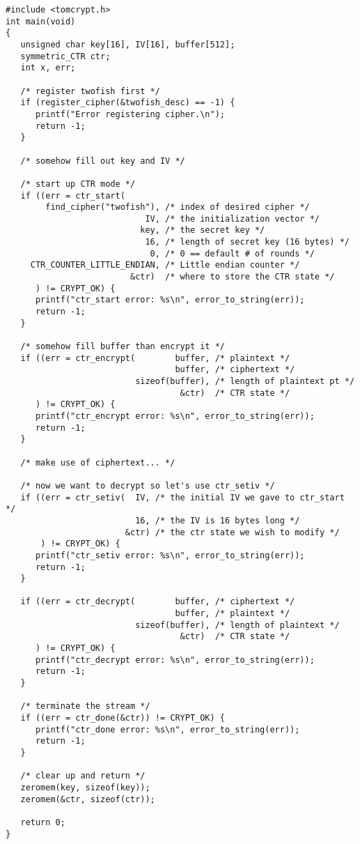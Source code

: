 \documentclass[synpaper]{book}
\begin{document}
\begin{small}
\begin{verbatim}
#include <tomcrypt.h>
int main(void)
{
   unsigned char key[16], IV[16], buffer[512];
   symmetric_CTR ctr;
   int x, err;

   /* register twofish first */
   if (register_cipher(&twofish_desc) == -1) {
      printf("Error registering cipher.\n");
      return -1;
   }

   /* somehow fill out key and IV */

   /* start up CTR mode */
   if ((err = ctr_start(
        find_cipher("twofish"), /* index of desired cipher */
                            IV, /* the initialization vector */
                           key, /* the secret key */
                            16, /* length of secret key (16 bytes) */
                             0, /* 0 == default # of rounds */
     CTR_COUNTER_LITTLE_ENDIAN, /* Little endian counter */
                         &ctr)  /* where to store the CTR state */
      ) != CRYPT_OK) {
      printf("ctr_start error: %s\n", error_to_string(err));
      return -1;
   }

   /* somehow fill buffer than encrypt it */
   if ((err = ctr_encrypt(        buffer, /* plaintext */
                                  buffer, /* ciphertext */
                          sizeof(buffer), /* length of plaintext pt */
                                   &ctr)  /* CTR state */
      ) != CRYPT_OK) {
      printf("ctr_encrypt error: %s\n", error_to_string(err));
      return -1;
   }

   /* make use of ciphertext... */

   /* now we want to decrypt so let's use ctr_setiv */
   if ((err = ctr_setiv(  IV, /* the initial IV we gave to ctr_start */
                          16, /* the IV is 16 bytes long */
                        &ctr) /* the ctr state we wish to modify */
       ) != CRYPT_OK) {
      printf("ctr_setiv error: %s\n", error_to_string(err));
      return -1;
   }

   if ((err = ctr_decrypt(        buffer, /* ciphertext */
                                  buffer, /* plaintext */
                          sizeof(buffer), /* length of plaintext */
                                   &ctr)  /* CTR state */
      ) != CRYPT_OK) {
      printf("ctr_decrypt error: %s\n", error_to_string(err));
      return -1;
   }

   /* terminate the stream */
   if ((err = ctr_done(&ctr)) != CRYPT_OK) {
      printf("ctr_done error: %s\n", error_to_string(err));
      return -1;
   }

   /* clear up and return */
   zeromem(key, sizeof(key));
   zeromem(&ctr, sizeof(ctr));

   return 0;
}
\end{verbatim}
\end{small}
\end{document}
